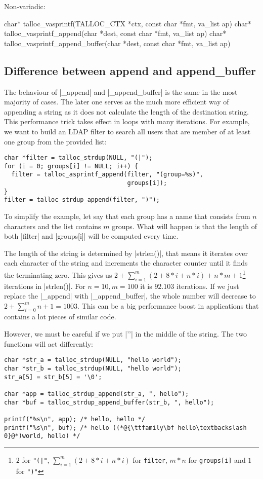 Non-variadic:
\begin{funcproto}
char* talloc_vasprintf(TALLOC_CTX *ctx, const char *fmt,
                       va_list ap)
char* talloc_vasprintf_append(char *dest, const char *fmt,
                              va_list ap)
char* talloc_vasprintf_append_buffer(char *dest, const char
                                     *fmt, va_list ap)
\end{funcproto}

\subsection{Difference between append and append_buffer}

The behaviour of |_append| and |_append_buffer| is the same in the most majority
of cases. The later one serves as the much more efficient way of appending a
string as it does not calculate the length of the destination string. This
performance trick takes effect in loops with many iterations. For example, we
want to build an LDAP filter to search all users that are member of at least one
group from the provided list:

\begin{lstlisting}[caption={Appending a string},label={lst:append_buffer}]
char *filter = talloc_strdup(NULL, "(|");
for (i = 0; groups[i] != NULL; i++) {
  filter = talloc_asprintf_append(filter, "(group=%s)",
                                  groups[i]);
}
filter = talloc_strdup_append(filter, ")");
\end{lstlisting}

To simplify the example, let say that each group has a name that consists from
$n$ characters and the list contains $m$ groups. What will happen is that
the length of both |filter| and |groups[i]| will be computed every time.

The length of the string is determined by |strlen()|, that means it iterates
over each character of the string and increments the character counter until it
finds the terminating zero. This gives us $2 + \sum_{i=1}^m (2 + 8*i + n*i) +
n*m + 1$\footnote{$2$ for \lstinline{"(|"}, $\sum_{i=1}^m (2 + 8*i + n*i)$ for
\lstinline{filter}, $m*n$ for \lstinline{groups[i]} and $1$ for \lstinline{")"}}
iterations in |strlen()|. For $n = 10, m = 100$ it is $92.103$ iterations. If
we just replace the |_append| with |_append_buffer|, the whole number will
decrease to $2 + \sum_{i=0}^m n + 1 = 1003$. This can be a big performance
boost in applications that contains a lot pieces of similar code.

However, we must be careful if we put |'\0'| in the middle of the string. The
two functions will act differently:

\begin{lstlisting}[caption={Zero in the middle of a string}]
char *str_a = talloc_strdup(NULL, "hello world");
char *str_b = talloc_strdup(NULL, "hello world");
str_a[5] = str_b[5] = '\0';

char *app = talloc_strdup_append(str_a, ", hello");
char *buf = talloc_strdup_append_buffer(str_b, ", hello");

printf("%s\n", app); /* hello, hello */
printf("%s\n", buf); /* hello ((*@{\ttfamily\bf hello\textbackslash 0}@*)world, hello) */
\end{lstlisting}
